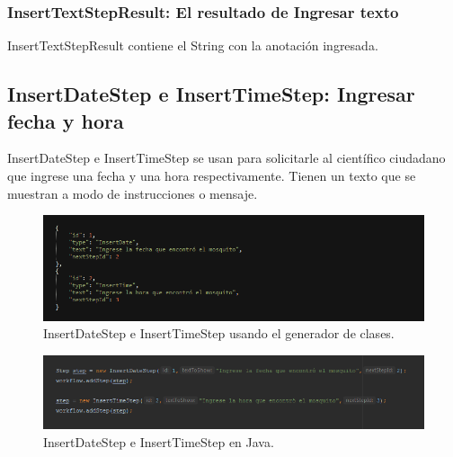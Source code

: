 \subsubsection{InsertTextStepResult: El resultado de Ingresar texto}
InsertTextStepResult contiene el String con la anotación ingresada.





\subsection{InsertDateStep e InsertTimeStep: Ingresar fecha y hora}
InsertDateStep e InsertTimeStep se usan para solicitarle al científico ciudadano que ingrese una fecha y una hora respectivamente. Tienen un texto que se muestran a modo de instrucciones o mensaje.


\begin{figure}[H]
  \centering
    \includegraphics[scale=0.6]{50-anexos/C-steps/insert_date_time_json.png} 
    \caption{InsertDateStep e InsertTimeStep usando el generador de clases.}
\end{figure}	

\begin{figure}[H]
  \centering
    \includegraphics[scale=0.6]{50-anexos/C-steps/insert_date_time_java.png} 
    \caption{InsertDateStep e InsertTimeStep en Java.}
\end{figure}

